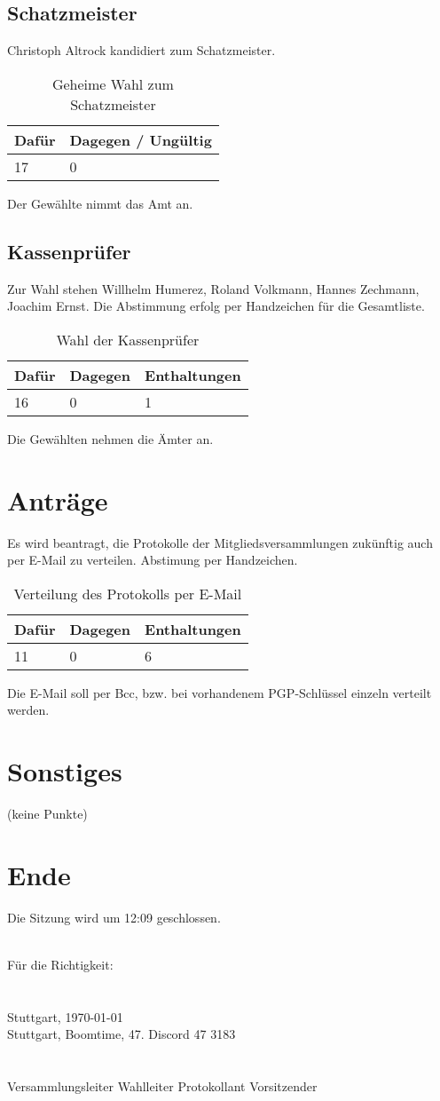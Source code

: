 \documentclass[a4paper]{scrartcl}
\begin{document}
\subsection{Schatzmeister}
Christoph Altrock kandidiert zum Schatzmeister.
\begin{table}[H]
	\begin{tabularx}{\textwidth}{XX}
		Dafür & Dagegen / Ungültig\\
		\toprule
		17 & 0\\
	\end{tabularx}
	\caption{Geheime Wahl zum Schatzmeister}
\end{table}
Der Gewählte nimmt das Amt an.
\subsection{Kassenprüfer}
Zur Wahl stehen Willhelm Humerez, Roland Volkmann, Hannes Zechmann, Joachim Ernst. Die Abstimmung erfolg per Handzeichen für die Gesamtliste.
\begin{table}[H]
	\begin{tabularx}{\textwidth}{XXX}
		Dafür & Dagegen & Enthaltungen\\
		\toprule
		16 & 0 & 1\\
	\end{tabularx}
	\caption{Wahl der Kassenprüfer}
\end{table}
Die Gewählten nehmen die Ämter an.
\clearpage
\section{Anträge}
Es wird beantragt, die Protokolle der Mitgliedsversammlungen zukünftig auch per E-Mail zu verteilen. Abstimung per Handzeichen.\\
\begin{table}[H]
	\begin{tabularx}{\textwidth}{XXX}
		Dafür & Dagegen & Enthaltungen\\
		\toprule
		11 & 0 & 6\\
	\end{tabularx}
	\caption{Verteilung des Protokolls per E-Mail}
\end{table}
Die E-Mail soll per Bcc, bzw. bei vorhandenem PGP-Schlüssel einzeln verteilt werden.

\section{Sonstiges}

(keine Punkte)\\

\section{Ende}

Die Sitzung wird um 12:09 geschlossen.

\vfill
\mbox{}\\
Für die Richtigkeit:\\
\\
\\
Stuttgart, \today\\
Stuttgart, Boomtime, 47. Discord 47 3183 \\
\\
\\
\hfill Versammlungsleiter \hfill Wahlleiter \hfill Protokollant \hfill Vorsitzender \hfill
\end{document}
